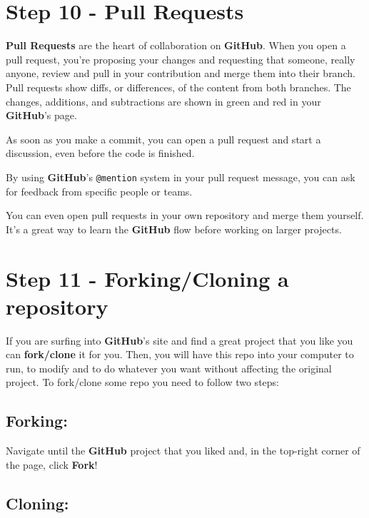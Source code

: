 \documentclass[12pt,a4paper,titlepage,brazil]{article}
\begin{document}
{%

\section{Step 10 - Pull Requests}

{\bf Pull Requests} are the heart of collaboration on {\bf GitHub}. When you open a pull request, you’re proposing your changes and requesting that someone, really anyone, review and pull in your contribution and merge them into their branch. Pull requests show diffs, or differences, of the content from both branches. The changes, additions, and subtractions are shown in {\color{green}green} and {\color{red}red} in your {\bf GitHub}'s page.

As soon as you make a commit, you can open a pull request and start a discussion, even before the code is finished.

By using {\bf GitHub}’s \texttt{@mention} system in your pull request message, you can ask for feedback from specific people or teams.

You can even open pull requests in your own repository and merge them yourself. It’s a great way to learn the {\bf GitHub} flow before working on larger projects.


\section{Step 11 - Forking/Cloning a repository}

If you are surfing into {\bf GitHub}'s site and find a great project that you like you can {\bf fork/clone} it for you. Then, you will have this repo into your computer to run, to modify and to do whatever you want without affecting the original project. To fork/clone some repo you need to follow two steps:

\subsection{Forking:}

Navigate until the {\bf GitHub} project that you liked and, in the top-right corner of the page, click {\bf Fork}!

\subsection{Cloning:}

}
\end{document}
